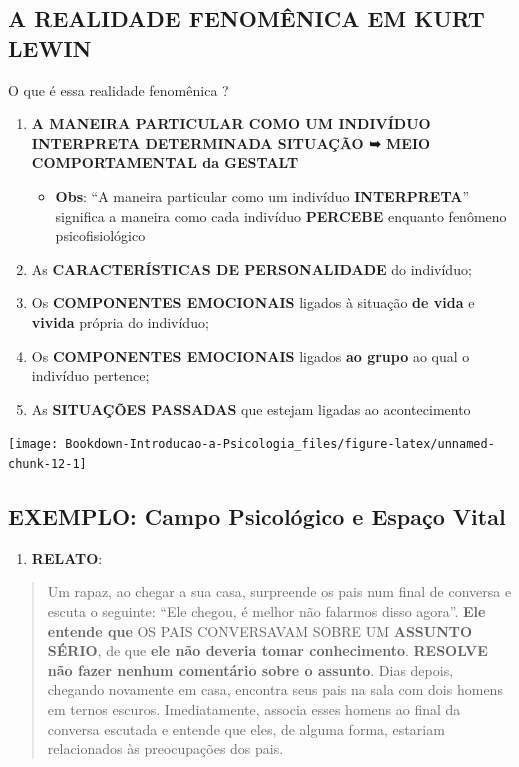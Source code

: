 \documentclass[
]{book}
\providecommand{\tightlist}{%
  \setlength{\itemsep}{0pt}\setlength{\parskip}{0pt}}
\begin{document}
\hypertarget{a-realidade-fenomuxeanica-em-kurt-lewin}{%
\subsection{A REALIDADE FENOMÊNICA EM KURT LEWIN}\label{a-realidade-fenomuxeanica-em-kurt-lewin}}

O que é essa realidade fenomênica ?

\begin{enumerate}
\def\labelenumi{\arabic{enumi}.}
\tightlist
\item
  \textbf{A MANEIRA PARTICULAR COMO UM INDIVÍDUO INTERPRETA DETERMINADA SITUAÇÃO ➥ MEIO COMPORTAMENTAL da GESTALT}

  \begin{itemize}
  \tightlist
  \item
    \textbf{Obs}: ``A maneira particular como um indivíduo \textbf{INTERPRETA}'' significa a maneira como cada indivíduo \textbf{PERCEBE} enquanto fenômeno psicofisiológico
  \end{itemize}
\item
  As \textbf{CARACTERÍSTICAS DE PERSONALIDADE} do indivíduo;
\item
  Os \textbf{COMPONENTES EMOCIONAIS} ligados à situação \textbf{de vida} e \textbf{vivida} própria do indivíduo;
\item
  Os \textbf{COMPONENTES EMOCIONAIS} ligados \textbf{ao grupo} ao qual o indivíduo pertence;
\item
  As \textbf{SITUAÇÕES PASSADAS} que estejam ligadas ao acontecimento
\end{enumerate}

\texttt{[image: Bookdown-Introducao-a-Psicologia\_files/figure-latex/unnamed-chunk-12-1]}

\hypertarget{exemplo-campo-psicoluxf3gico-e-espauxe7o-vital}{%
\subsection{EXEMPLO: Campo Psicológico e Espaço Vital}\label{exemplo-campo-psicoluxf3gico-e-espauxe7o-vital}}

\begin{enumerate}
\def\labelenumi{\arabic{enumi}.}
\tightlist
\item
  \textbf{RELATO}:
\end{enumerate}

\begin{quote}
Um rapaz, ao chegar a sua casa, surpreende os pais num final de conversa e escuta o seguinte: ``Ele chegou, é melhor não falarmos disso agora''. \textbf{Ele entende que} OS PAIS CONVERSAVAM SOBRE UM \textbf{ASSUNTO SÉRIO}, de que \textbf{ele não deveria tomar conhecimento}. \textbf{RESOLVE não fazer nenhum comentário sobre o assunto}. Dias depois, chegando novamente em casa, encontra seus pais na sala com dois homens em ternos escuros. Imediatamente, associa esses homens ao final da conversa escutada e entende que eles, de alguma forma, estariam relacionados às preocupações dos pais.
\end{quote}
\end{document}
